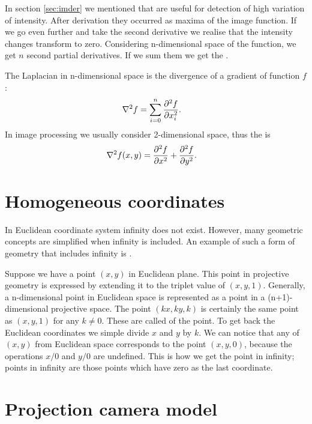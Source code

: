 In section \ref{sec:imder} we mentioned  that are useful for detection of high variation of intensity.
After derivation they occurred as maxima of the image function.
If we go even further and take the second derivative we realise that the intensity changes transform to zero.
Considering n-dimensional space of the function, we get $n$ second partial derivatives.
If we sum them we get the .

\begin{definition}
The Laplacian in n-dimensional space is the divergence of a gradient of function $f$:
\begin{align*}
\nabla ^{2}f&= \sum_{i=0}^{n} \frac{ \partial^2 f }{  \partial x_i^2  }.
\end{align*}
In image processing we usually consider 2-dimensional space, thus the  is
\begin{align*}
\nabla ^{2}f(x, y)&=\frac{ \partial^2 f }{ \partial x^2 } + \frac{ \partial^2 f }{ \partial y^2 }.
\end{align*}
\end{definition} 

\section{Homogeneous coordinates}
In Euclidean coordinate system infinity does not exist.
However, many geometric concepts are simplified when infinity is included.
An example of such a form of geometry that includes infinity is .

Suppose we have a point $(x, y)$ in Euclidean plane.
This point in projective geometry is expressed by extending it to the triplet value of $(x, y, 1)$.
Generally, a n-dimensional point in Euclidean space is represented as a point in a (n+1)-dimensional projective space.
The point $(kx, ky, k)$ is certainly the same point as $(x, y, 1)$ for any $k \neq 0$.
These are called  of the point.
To get back the Euclidean coordinates we simple divide $x$ and $y$ by $k$.
We can notice that any of $(x, y)$ from Euclidean space corresponds to the point $(x, y, 0)$, because the operations $x/0$ and $y/0$ are undefined.
This is how we get the point in infinity; points in infinity are those points which have zero as the last coordinate.


\section{Projection camera model}

